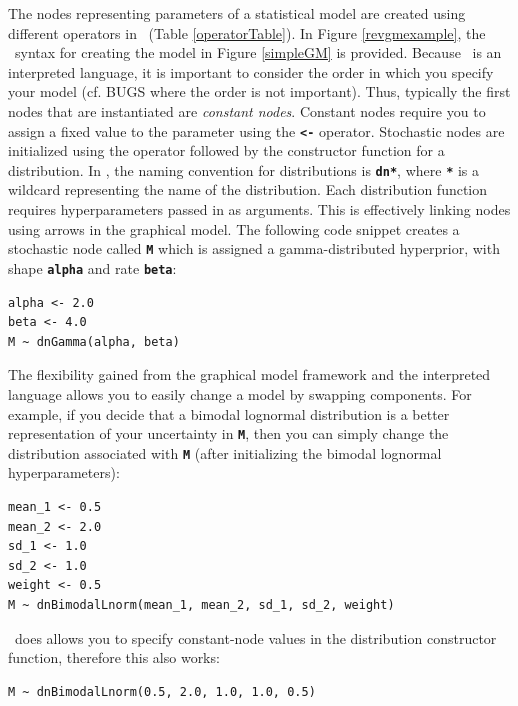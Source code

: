 \documentclass[11pt]{article}
\newcommand{\cl}[1]{{\texttt{\textbf{#1}}}}
\newcommand{\rbdn}{{\Large \symbol{126}}} %
\begin{document}
The nodes representing parameters of a statistical model are created using different operators in \Rev~(Table \ref{operatorTable}). 
In Figure \ref{revgmexample}, the \Rev~syntax for creating the model in Figure \ref{simpleGM} is provided.
Because \Rev~is an interpreted language, it is important to consider the order in which you specify your model (cf. BUGS where the order is not important). 
Thus, typically the first nodes that are instantiated are \emph{constant nodes}. 
Constant nodes require you to assign a fixed value to the parameter using the \cl{<-} operator. 
Stochastic nodes are initialized using the \cl{\rbdn} operator followed by the constructor function for a distribution. 
In \Rev, the naming convention for distributions is \cl{dn*}, where \cl{*} is a wildcard representing the name of the distribution. 
Each distribution function requires hyperparameters passed in as arguments. 
This is effectively linking nodes using arrows in the graphical model.
The following code snippet creates a stochastic node called \cl{M} which is assigned a gamma-distributed hyperprior, with shape \cl{alpha} and rate \cl{beta}:
{\tt \begin{snugshade*}
\begin{lstlisting}
alpha <- 2.0
beta <- 4.0
M ~ dnGamma(alpha, beta)
\end{lstlisting}
\end{snugshade*}}

The flexibility gained from the graphical model framework and the interpreted language allows you to easily change a model by swapping components. 
For example, if you decide that a bimodal lognormal distribution is a better representation of your uncertainty in \cl{M}, then you can simply change the distribution associated with \cl{M} (after initializing the bimodal lognormal hyperparameters):
{\tt \begin{snugshade*}
\begin{lstlisting}
mean_1 <- 0.5
mean_2 <- 2.0
sd_1 <- 1.0
sd_2 <- 1.0
weight <- 0.5
M ~ dnBimodalLnorm(mean_1, mean_2, sd_1, sd_2, weight)
\end{lstlisting}
\end{snugshade*}}

\Rev~does allows you to specify constant-node values in the distribution constructor function, therefore this also works:
{\tt \begin{snugshade*}
\begin{lstlisting}
M ~ dnBimodalLnorm(0.5, 2.0, 1.0, 1.0, 0.5)
\end{lstlisting}
\end{snugshade*}}
\end{document}
